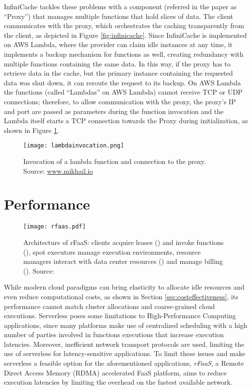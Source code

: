 \documentclass[
	a4paper, %
	12pt,
	twoside, %
]{LTJournalArticle}
\DeclareRobustCommand*\circledColorSmall[2]{\tikz[baseline=(char.base)]{
    \node[shape=circle,fill=#2,draw=#2,inner sep=0pt] (char) {\textcolor{white}{\footnotesize\textbf{#1}}};}}
\begin{document}
InfiniCache tackles these problems with a component (referred in the paper as ``Proxy'') that manages multiple functions that hold slices of data. The client communicates with the proxy, which orchestrates the caching transparently from the client, as depicted in Figure \ref{fig:infinicache}.
Since InfiniCache is implemented on AWS Lambda, where the provider can claim idle instances at any time, it implements a backup mechanism for functions as well, creating redundancy with multiple functions containing the same data. In this way, if the proxy has to retrieve data in the cache, but the primary instance containing the requested data was shut down, it can reroute the request to its backup.
On AWS Lambda the functions (called ``Lambdas'' on AWS Lambda) cannot receive TCP or UDP connections; therefore, to allow communication with the proxy, the proxy's IP and port are passed as parameters during the function invocation and the Lambda itself starts a TCP connection towards the Proxy during initialization, as shown in Figure \ref{fig:lambdainvocation}. 

\begin{figure}[!hbt]
	\texttt{[image: lambdainvocation.png]}
	\caption{Invocation of a lambda function and connection to the proxy. Source: \href{https://mikhail.io/2020/03/infinicache-distributed-cache-on-aws-lambda/}{www.mikhail.io}}
	\label{fig:lambdainvocation}
\end{figure}

\section{Performance}
\label{sec:performance}

\begin{figure}[!hbt]
	\texttt{[image: rfaas.pdf]}
	\caption{Architecture of rFaaS: clients acquire leases (\circledColorSmall{A}{brown}) and invoke functions (\circledColorSmall{D}{brown}), spot executors manage execution environments, resource managers interact with data center resources (\circledColorSmall{C}{brown}) and manage billing (\circledColorSmall{B}{brown}). Source: \cite{copik_rfaas_2023}}
	\label{fig:rfaas}
\end{figure}

While modern cloud paradigms can bring elasticity to allocate idle resources and even reduce computational costs, as shown in Section \ref{sec:costeffectiveness}, its performance cannot match cluster allocations and coarse-grained cloud executions. Serverless poses some limitations to High-Performance Computing applications, since many platforms make use of centralized scheduling with a high number of parties involved in functions executions that increase execution latencies. Moreover, inefficient network transport protocols are used, limiting the use of serverless for latency-sensitive applications. To limit these issues and make serverless a feasible option for the aforementioned applications, \textit{rFaaS}, a Remote Direct Access Memory (RDMA) accelerated FaaS platform, aims to reduce execution latencies by limiting the overhead on the fastest available network.
\end{document}
